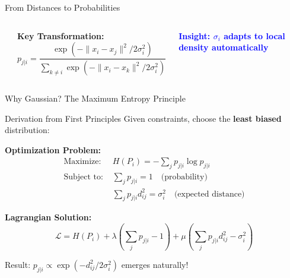 \documentclass[aspectratio=169]{beamer}
\newcommand{\conceptbox}[2]{\colorbox{#1!20}{\textcolor{#1}{\textbf{#2}}}}
\newcommand{\insight}[1]{\conceptbox{blue}{Insight: #1}}
\begin{document}
\begin{frame}{From Distances to Probabilities}
\begin{columns}
\begin{center}
\end{center}

\textbf{Key Transformation:}
$$p_{j|i} = \frac{\exp(-\|x_i - x_j\|^2/2\sigma_i^2)}{\sum_{k \neq i} \exp(-\|x_i - x_k\|^2/2\sigma_i^2)}$$

\vspace{0.3cm}
\insight{$\sigma_i$ adapts to local density automatically}
\end{columns}
\end{frame}

\begin{frame}{Why Gaussian? The Maximum Entropy Principle}
\begin{block}{Derivation from First Principles}
Given constraints, choose the \textbf{least biased} distribution:
\end{block}

\textbf{Optimization Problem:}
\begin{align*}
\text{Maximize: } & H(P_i) = -\sum_j p_{j|i} \log p_{j|i} \\
\text{Subject to: } & \sum_j p_{j|i} = 1 \quad \text{(probability)} \\
& \sum_j p_{j|i} d_{ij}^2 = \sigma_i^2 \quad \text{(expected distance)}
\end{align*}

\textbf{Lagrangian Solution:}
$$\mathcal{L} = H(P_i) + \lambda\left(\sum_j p_{j|i} - 1\right) + \mu\left(\sum_j p_{j|i}d_{ij}^2 - \sigma_i^2\right)$$

\begin{center}
\colorbox{yellow!30}{\parbox{\textwidth}{Result: $p_{j|i} \propto \exp(-d_{ij}^2/2\sigma_i^2)$ emerges naturally!}}
\end{center}
\end{frame}
\end{document}
